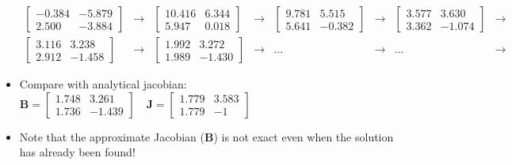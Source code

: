 \begin{frame}[fragile]
\begin{itemize}
\begin{tiny}
\begin{align*}
\begin{bmatrix}
          -0.384 & -5.879 \\
          2.500 & -3.884
          \end{bmatrix} & \rightarrow &
          \begin{bmatrix}
          10.416 & 6.344 \\
          5.947 & 0.018
          \end{bmatrix} & \rightarrow &
          \begin{bmatrix}
          9.781 & 5.515 \\
          5.641 & -0.382
          \end{bmatrix} & \rightarrow &
          \begin{bmatrix}
          3.577 & 3.630 \\
          3.362 & -1.074
          \end{bmatrix} & \rightarrow &\\
          \begin{bmatrix}
          3.116 & 3.238 \\
          2.912 & -1.458
          \end{bmatrix} & \rightarrow &
          \begin{bmatrix}
          1.992 & 3.272 \\
          1.989 & -1.430
          \end{bmatrix} & \rightarrow & \hdots & \rightarrow & \hdots & \rightarrow &
  \end{align*}  
    \end{tiny}

    \item Compare with analytical jacobian:
    \(
      \textbf{B}=\begin{bmatrix}
      1.748 & 3.261 \\
      1.736 & -1.439
      \end{bmatrix}\quad
      \textbf{J}=
      \begin{bmatrix}
      1.779 & 3.583 \\
      1.779 & -1
      \end{bmatrix}
      \)
      \item Note that the approximate Jacobian (\(\textbf{B}\)) is not exact even when the solution has already been found!
    \end{itemize}
  \end{frame}
  
